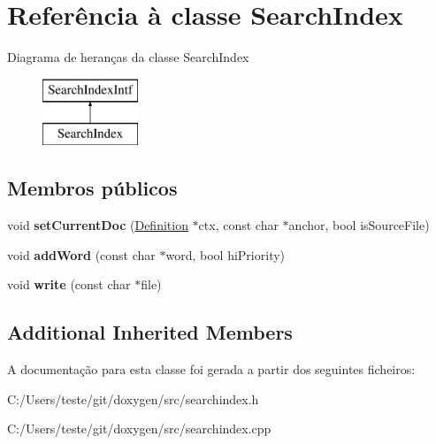 \hypertarget{class_search_index}{\section{Referência à classe Search\-Index}
\label{class_search_index}
}
Diagrama de heranças da classe Search\-Index\begin{figure}[H]
\begin{center}
\leavevmode
\includegraphics[height=2.000000cm]{class_search_index}
\end{center}
\end{figure}
\subsection*{Membros públicos}
\begin{DoxyCompactItemize}
\item 
\hypertarget{class_search_index_acc249d4a52270a8445bfc2204a399b4a}{void {\bfseries set\-Current\-Doc} (\hyperlink{class_definition}{Definition} $\ast$ctx, const char $\ast$anchor, bool is\-Source\-File)}\label{class_search_index_acc249d4a52270a8445bfc2204a399b4a}

\item 
\hypertarget{class_search_index_aef206d2620c6a5bc4afcb9a3874dc6b2}{void {\bfseries add\-Word} (const char $\ast$word, bool hi\-Priority)}\label{class_search_index_aef206d2620c6a5bc4afcb9a3874dc6b2}

\item 
\hypertarget{class_search_index_afa926fcfb9459ef9d88b8fcafb5552b7}{void {\bfseries write} (const char $\ast$file)}\label{class_search_index_afa926fcfb9459ef9d88b8fcafb5552b7}

\end{DoxyCompactItemize}
\subsection*{Additional Inherited Members}


A documentação para esta classe foi gerada a partir dos seguintes ficheiros\-:\begin{DoxyCompactItemize}
\item 
C\-:/\-Users/teste/git/doxygen/src/searchindex.\-h\item 
C\-:/\-Users/teste/git/doxygen/src/searchindex.\-cpp\end{DoxyCompactItemize}
